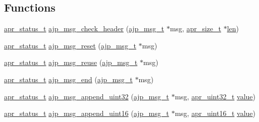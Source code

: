 \subsection*{Functions}
\begin{DoxyCompactItemize}
\item 
\hyperlink{group__apr__errno_gaa5105fa83cc322f09382292db8b47593}{apr\+\_\+status\+\_\+t} \hyperlink{group__AJP__api_ga63c0d2b85c2423d519924c0127d3b99b}{ajp\+\_\+msg\+\_\+check\+\_\+header} (\hyperlink{group__AJP__defines_ga863bb515e9c32a605d3833fa88d9b643}{ajp\+\_\+msg\+\_\+t} $\ast$msg, \hyperlink{group__apr__platform_gaaa72b2253f6f3032cefea5712a27540e}{apr\+\_\+size\+\_\+t} $\ast$\hyperlink{group__APR__Util__XML_ga1e9401816e3a1cf930f448db46978ea7}{len})
\item 
\hyperlink{group__apr__errno_gaa5105fa83cc322f09382292db8b47593}{apr\+\_\+status\+\_\+t} \hyperlink{group__AJP__api_gac85c7fdc0995b29207d13c7ea35b3f1e}{ajp\+\_\+msg\+\_\+reset} (\hyperlink{group__AJP__defines_ga863bb515e9c32a605d3833fa88d9b643}{ajp\+\_\+msg\+\_\+t} $\ast$msg)
\item 
\hyperlink{group__apr__errno_gaa5105fa83cc322f09382292db8b47593}{apr\+\_\+status\+\_\+t} \hyperlink{group__AJP__api_ga4fd149b37d846c30cadfc593b31e272e}{ajp\+\_\+msg\+\_\+reuse} (\hyperlink{group__AJP__defines_ga863bb515e9c32a605d3833fa88d9b643}{ajp\+\_\+msg\+\_\+t} $\ast$msg)
\item 
\hyperlink{group__apr__errno_gaa5105fa83cc322f09382292db8b47593}{apr\+\_\+status\+\_\+t} \hyperlink{group__AJP__api_gad2b6d66e5dbf8369ab3d2e64adf81232}{ajp\+\_\+msg\+\_\+end} (\hyperlink{group__AJP__defines_ga863bb515e9c32a605d3833fa88d9b643}{ajp\+\_\+msg\+\_\+t} $\ast$msg)
\item 
\hyperlink{group__apr__errno_gaa5105fa83cc322f09382292db8b47593}{apr\+\_\+status\+\_\+t} \hyperlink{group__AJP__api_ga99f6ddd719a876f0cf4101958b09436b}{ajp\+\_\+msg\+\_\+append\+\_\+uint32} (\hyperlink{group__AJP__defines_ga863bb515e9c32a605d3833fa88d9b643}{ajp\+\_\+msg\+\_\+t} $\ast$msg, \hyperlink{group__apr__platform_ga558548a135d8a816c4787250744ea147}{apr\+\_\+uint32\+\_\+t} \hyperlink{pcretest_8txt_a262ad32c75be9b93a7a77b045ed14fe0}{value})
\item 
\hyperlink{group__apr__errno_gaa5105fa83cc322f09382292db8b47593}{apr\+\_\+status\+\_\+t} \hyperlink{group__AJP__api_gad054654d41969f19efc5a6234e661e07}{ajp\+\_\+msg\+\_\+append\+\_\+uint16} (\hyperlink{group__AJP__defines_ga863bb515e9c32a605d3833fa88d9b643}{ajp\+\_\+msg\+\_\+t} $\ast$msg, \hyperlink{group__apr__platform_ga3fb87c977e28a526d872d1081411b129}{apr\+\_\+uint16\+\_\+t} \hyperlink{pcretest_8txt_a262ad32c75be9b93a7a77b045ed14fe0}{value})

\end{DoxyCompactItemize}
